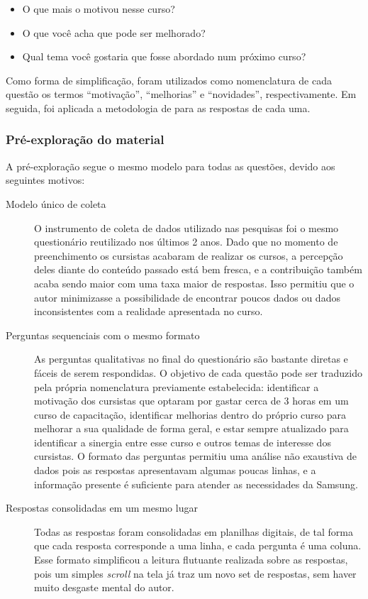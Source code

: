 \begin{itemize}
\item O que mais o motivou nesse curso?
\item O que você acha que pode ser melhorado?
\item Qual tema você gostaria que fosse abordado num próximo curso?
\end{itemize}

Como forma de simplificação, foram utilizados como nomenclatura de cada questão os termos \enquote{motivação}, \enquote{melhorias} e \enquote{novidades}, respectivamente. Em seguida, foi aplicada a metodologia de  para as respostas de cada uma.

\subsubsection*{Pré-exploração do material}

A pré-exploração segue o mesmo modelo para todas as questões, devido aos seguintes motivos:

\begin{description}
\item[Modelo único de coleta] O instrumento de coleta de dados utilizado nas pesquisas foi o mesmo questionário reutilizado nos últimos 2 anos. Dado que no momento de preenchimento os cursistas acabaram de realizar os cursos, a percepção deles diante do conteúdo passado está bem fresca, e a contribuição também acaba sendo maior com uma taxa maior de respostas. Isso permitiu que o autor minimizasse a possibilidade de encontrar poucos dados ou dados inconsistentes com a realidade apresentada no curso.
\item[Perguntas sequenciais com o mesmo formato] As perguntas qualitativas no final do questionário são bastante diretas e fáceis de serem respondidas. O objetivo de cada questão pode ser traduzido pela própria nomenclatura previamente estabelecida: identificar a motivação dos cursistas que optaram por {gastar} cerca de 3 horas em um curso de capacitação, identificar melhorias dentro do próprio curso para melhorar a sua qualidade de forma geral, e estar sempre atualizado para identificar a sinergia entre esse curso e outros temas de interesse dos cursistas. O formato das perguntas permitiu uma análise não exaustiva de dados pois as respostas apresentavam algumas poucas linhas, e a informação presente é suficiente para atender as necessidades da Samsung.
\item[Respostas consolidadas em um mesmo lugar] Todas as respostas foram consolidadas em planilhas digitais, de tal forma que cada resposta corresponde a uma linha, e cada pergunta é uma coluna. Esse formato simplificou a leitura flutuante realizada sobre as respostas, pois um simples \textit{scroll} na tela já traz um novo set de respostas, sem haver muito desgaste mental do autor.
\end{description}

